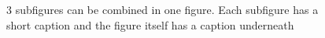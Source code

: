 \begin{figure}[p]
\caption[Figure with multiple subfigures]{3 subfigures can be combined in one figure. Each subfigure has a short caption and the figure itself has a caption underneath}
\label{fig:FACS-diff-comparison}
\end{figure}


